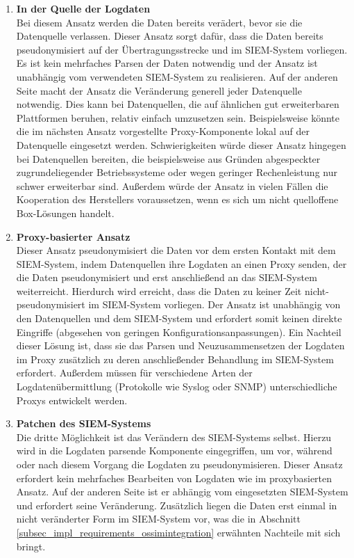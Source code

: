 \begin{enumerate}

\item \textbf{In der Quelle der Logdaten}\\
  Bei diesem Ansatz werden die Daten bereits verädert, bevor sie die Datenquelle verlassen. Dieser Ansatz sorgt dafür, dass die Daten bereits pseudonymisiert auf der Übertragungsstrecke und im SIEM-System vorliegen. Es ist kein mehrfaches Parsen der Daten notwendig und der Ansatz ist unabhängig vom verwendeten SIEM-System zu realisieren. Auf der anderen Seite macht der Ansatz die Veränderung generell jeder Datenquelle notwendig. Dies kann bei Datenquellen, die auf ähnlichen gut erweiterbaren Plattformen beruhen, relativ einfach umzusetzen sein. Beispielsweise könnte die im nächsten Ansatz vorgestellte Proxy-Komponente lokal auf der Datenquelle eingesetzt werden. Schwierigkeiten würde dieser Ansatz hingegen bei Datenquellen bereiten, die beispielsweise aus Gründen abgespeckter zugrundeliegender Betriebssysteme oder wegen geringer Rechenleistung nur schwer erweiterbar sind. Außerdem würde der Ansatz in vielen Fällen die Kooperation des Herstellers voraussetzen, wenn es sich um nicht quelloffene \glqq{}Box\grqq{}-Lösungen handelt.

\item \textbf{Proxy-basierter Ansatz}\\
  Dieser Ansatz pseudonymisiert die Daten vor dem ersten Kontakt mit dem SIEM-System, indem Datenquellen ihre Logdaten an einen Proxy senden, der die Daten pseudonymisiert und erst anschließend an das SIEM-System weiterreicht. Hierdurch wird erreicht, dass die Daten zu keiner Zeit nicht-pseudonymisiert im SIEM-System vorliegen. Der Ansatz ist unabhängig von den Datenquellen und dem SIEM-System und erfordert somit keinen direkte Eingriffe (abgesehen von geringen Konfigurationsanpassungen). Ein Nachteil dieser Lösung ist, dass sie das Parsen und Neuzusammensetzen der Logdaten im Proxy zusätzlich zu deren anschließender Behandlung im SIEM-System erfordert. Außerdem müssen für verschiedene Arten der Logdatenübermittlung (Protokolle wie Syslog oder SNMP) unterschiedliche Proxys entwickelt werden.

\item \textbf{Patchen des SIEM-Systems}\\
  Die dritte Möglichkeit ist das Verändern des SIEM-Systems selbst. Hierzu wird in die Logdaten parsende Komponente eingegriffen, um vor, während oder nach diesem Vorgang die Logdaten zu pseudonymisieren. Dieser Ansatz erfordert kein mehrfaches Bearbeiten von Logdaten wie im proxybasierten Ansatz. Auf der anderen Seite ist er abhängig vom eingesetzten SIEM-System und erfordert seine Veränderung. Zusätzlich liegen die Daten erst einmal in nicht veränderter Form im SIEM-System vor, was die in Abschnitt \ref{subsec_impl_requirements_ossimintegration} erwähnten Nachteile mit sich bringt.

\end{enumerate}

